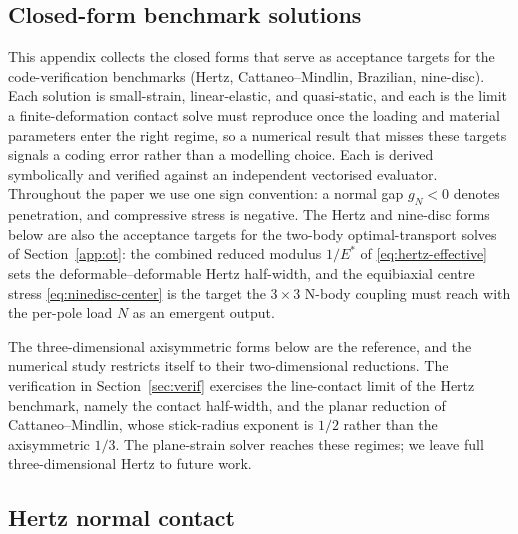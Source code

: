 \documentclass{svjour3}                 %
\newcommand{\gn}{g_{\scriptscriptstyle N}}
\begin{document}
\begin{appendix}
\section{Closed-form benchmark solutions}\label{app:closedforms}

This appendix collects the closed forms that serve as acceptance targets for the
code-verification benchmarks (Hertz, Cattaneo--Mindlin, Brazilian, nine-disc). Each solution is small-strain, linear-elastic,
and quasi-static, and each is the limit a finite-deformation contact solve must reproduce
once the loading and material parameters enter the right regime, so a numerical
result that misses these targets signals a coding error rather than a modelling choice. Each
is derived symbolically and verified against an independent vectorised evaluator.
Throughout the paper we use one sign convention: a normal gap $\gn<0$ denotes penetration, and
compressive stress is negative. The Hertz and nine-disc forms below are also the acceptance targets for the
two-body optimal-transport solves of Section~\ref{app:ot}: the combined reduced modulus $1/E^{*}$ of
\eqref{eq:hertz-effective} sets the deformable--deformable Hertz half-width, and the equibiaxial centre stress
\eqref{eq:ninedisc-center} is the target the $3\times3$ N-body coupling must reach with the per-pole load $N$ as
an emergent output.

The three-dimensional axisymmetric forms below are the reference, and the
numerical study restricts itself to their two-dimensional reductions. The verification in
Section~\ref{sec:verif} exercises the line-contact limit of the Hertz benchmark, namely the contact
half-width, and the planar reduction of Cattaneo--Mindlin, whose stick-radius exponent is $1/2$ rather
than the axisymmetric $1/3$. The plane-strain solver reaches these regimes; we leave full
three-dimensional Hertz to future work.

\subsection{Hertz normal contact}\label{app:hertz}


\end{appendix}
\end{document}

